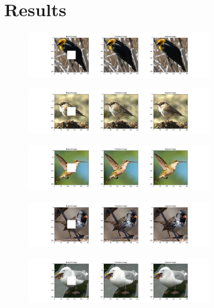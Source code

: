 \documentclass[conference]{IEEEtran}
\begin{document}
\section{Results}

\begin{figure}[H]
  \centering
  \includegraphics[width=80mm, keepaspectratio]{figures/result_1.png}
\end{figure}

\begin{figure}[H]
  \centering
  \includegraphics[width=80mm, keepaspectratio]{figures/result_2.png}
\end{figure}

\begin{figure}[H]
  \centering
  \includegraphics[width=80mm, keepaspectratio]{figures/result_3.png}
\end{figure}

\begin{figure}[H]
  \centering
  \includegraphics[width=80mm, keepaspectratio]{figures/result_4.png}
\end{figure}

\begin{figure}[H]
  \centering
  \includegraphics[width=80mm, keepaspectratio]{figures/result_5.png}
\end{figure}
\end{document}
